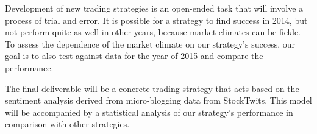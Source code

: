 Development of new trading strategies is an open-ended task that will involve a process of trial and error.
It is possible for a strategy to find success in 2014, but not perform quite as well in other years, because market climates can be fickle.
To assess the dependence of the market climate on our strategy's success, our goal is to also test against data for the year of 2015 and compare the performance.

The final deliverable will be a concrete trading strategy that acts based on the sentiment analysis derived from micro-blogging data from StockTwits.
This model will be accompanied by a statistical analysis of our strategy's performance in comparison with other strategies.

